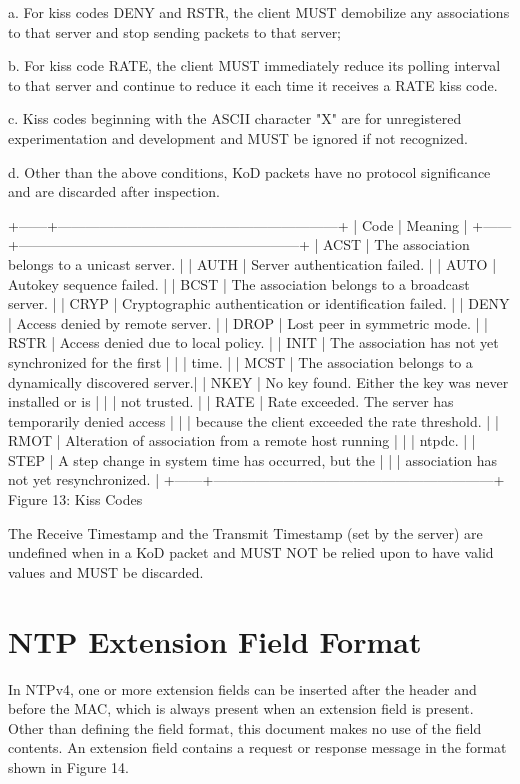 a. For kiss codes DENY and RSTR, the client MUST demobilize any
associations to that server and stop sending packets to that
server;

b. For kiss code RATE, the client MUST immediately reduce its
polling interval to that server and continue to reduce it each
time it receives a RATE kiss code.

c. Kiss codes beginning with the ASCII character "X" are for
unregistered experimentation and development and MUST be ignored
if not recognized.

d. Other than the above conditions, KoD packets have no protocol
significance and are discarded after inspection.

+------+------------------------------------------------------------+
| Code | Meaning |
+------+------------------------------------------------------------+
| ACST | The association belongs to a unicast server. |
| AUTH | Server authentication failed. |
| AUTO | Autokey sequence failed. |
| BCST | The association belongs to a broadcast server. |
| CRYP | Cryptographic authentication or identification failed. |
| DENY | Access denied by remote server. |
| DROP | Lost peer in symmetric mode. |
| RSTR | Access denied due to local policy. |
| INIT | The association has not yet synchronized for the first |
| | time. |
| MCST | The association belongs to a dynamically discovered server.|
| NKEY | No key found. Either the key was never installed or is |
| | not trusted. |
| RATE | Rate exceeded. The server has temporarily denied access |
| | because the client exceeded the rate threshold. |
| RMOT | Alteration of association from a remote host running |
| | ntpdc. |
| STEP | A step change in system time has occurred, but the |
| | association has not yet resynchronized. |
+------+------------------------------------------------------------+
Figure 13: Kiss Codes

The Receive Timestamp and the Transmit Timestamp (set by the server)
are undefined when in a KoD packet and MUST NOT be relied upon to
have valid values and MUST be discarded.

\section{NTP Extension Field Format}

In NTPv4, one or more extension fields can be inserted after the
header and before the MAC, which is always present when an extension
field is present. Other than defining the field format, this
document makes no use of the field contents. An extension field
contains a request or response message in the format shown in
Figure 14.

